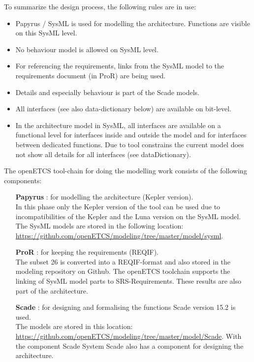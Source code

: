 \documentclass{template/openetcs_article}
\begin{document}
To summarize the design process, the following rules are in use:
\begin{itemize}
\item Papyrus / SysML is used for modelling the architecture. Functions are visible on this SysML level.
\item No behaviour model is allowed on SysML level.
\item For referencing the requirements, links from the SysML model to the requirements document (in ProR) are being used.
\item Details and especially behaviour is part of the Scade models.
\item All interfaces (see also data-dictionary below) are available on bit-level.
\item In the architecture model in SysML, all interfaces are available on a functional level for interfaces inside and outside the model and for interfaces between dedicated functions. Due to tool constrains the current model does not show all details for all interfaces (see dataDictionary).
\end{itemize}

The openETCS tool-chain for doing the modelling work consists of the following components:
\begin{itemize}
	\item [\textbf{Papyrus}]: for modelling the architecture (Kepler version).\\
	In this phase only the Kepler version of the tool can be used due to incompatibilities of the Kepler and the Luna version on the SysML model. The SysML models are stored in the following location: \url{https://github.com/openETCS/modeling/tree/master/model/sysml}.
	\item [\textbf{ProR}]: for keeping the requirements (REQIF).\\
	The subset 26 is converted into a REQIF-format and also stored in the modeling repository on Github. The openETCS toolchain supports the linking of SysML model parts to SRS-Requirements. These results are also part of the architecture.
	\item [\textbf{Scade}]: for designing and formalising the functions Scade version 15.2 is used.\\
	The models are stored in this location: \url{https://github.com/openETCS/modeling/tree/master/model/Scade}.
	With the component Scade System Scade also has a component for designing the architecture.
\end{itemize}
\end{document}
